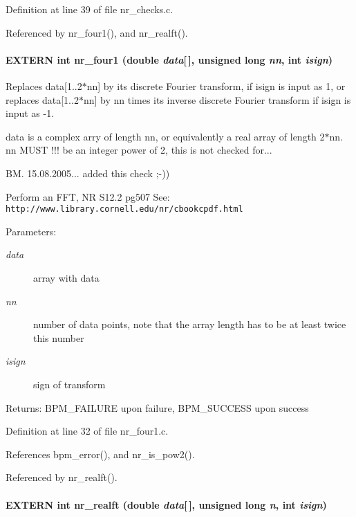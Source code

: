 Definition at line 39 of file nr\_\-checks.c.

Referenced by nr\_\-four1(), and nr\_\-realft().
\paragraph[nr\_\-four1]{\setlength{\rightskip}{0pt plus 5cm}EXTERN int nr\_\-four1 (double {\em data}[$\,$], \/  unsigned long {\em nn}, \/  int {\em isign})}\hfill\label{group__nr_g61f003673b86074827c601b6db2bc705}


Replaces data[1..2$\ast$nn] by its discrete Fourier transform, if isign is input as 1, or replaces data[1..2$\ast$nn] by nn times its inverse discrete Fourier transform if isign is input as -1.

data is a complex arry of length nn, or equivalently a real array of length 2$\ast$nn. nn MUST !!! be an integer power of 2, this is not checked for...

BM. 15.08.2005... added this check ;-))

Perform an FFT, NR S12.2 pg507 See: {\tt http://www.library.cornell.edu/nr/cbookcpdf.html}

\begin{Desc}
\item[Parameters:]
\begin{description}
\item[{\em data}]array with data \item[{\em nn}]number of data points, note that the array length has to be at least twice this number \item[{\em isign}]sign of transform\end{description}
\end{Desc}
\begin{Desc}
\item[Returns:]BPM\_\-FAILURE upon failure, BPM\_\-SUCCESS upon success \end{Desc}


Definition at line 32 of file nr\_\-four1.c.

References bpm\_\-error(), and nr\_\-is\_\-pow2().

Referenced by nr\_\-realft().
\paragraph[nr\_\-realft]{\setlength{\rightskip}{0pt plus 5cm}EXTERN int nr\_\-realft (double {\em data}[$\,$], \/  unsigned long {\em n}, \/  int {\em isign})}\hfill\label{group__nr_g415e34443b84bf6313691b0802607830}


